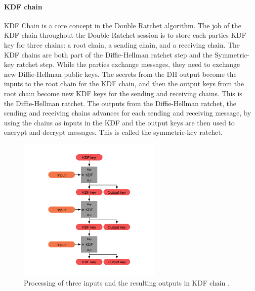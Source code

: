 \paragraph{KDF chain}

KDF Chain is a core concept in the Double Ratchet algorithm.
The job of the KDF chain throughout the Double Ratchet session is to
store each parties KDF key for three chains: a root chain, a sending chain, and
a receiving chain.
The KDF chains are both part of the Diffie-Hellman ratchet step and
the Symmetric-key ratchet step. While the parties exchange messages, they
need to exchange new Diffie-Hellman public keys. The secrets from the DH
output become the inputs to the root chain for the KDF chain, and then the output keys from the root chain become new KDF keys for the sending and
receiving chains. This is the Diffie-Hellman ratchet.
The outputs from the Diffie-Hellman ratchet, the sending and receiving
chains advances for each sending and receiving message, by using the
chains as inputs in the KDF and the output keys are then used to encrypt
and decrypt messages. This is called the symmetric-key ratchet.

\begin{figure}[H]
	\centering
	\includegraphics[width=7cm]{figures/kdfchain.png}
	\caption{Processing of three inputs and the resulting outputs in KDF chain \cite{doubleratchet}.}
	\label{fig:kdfchain}
\end{figure}

